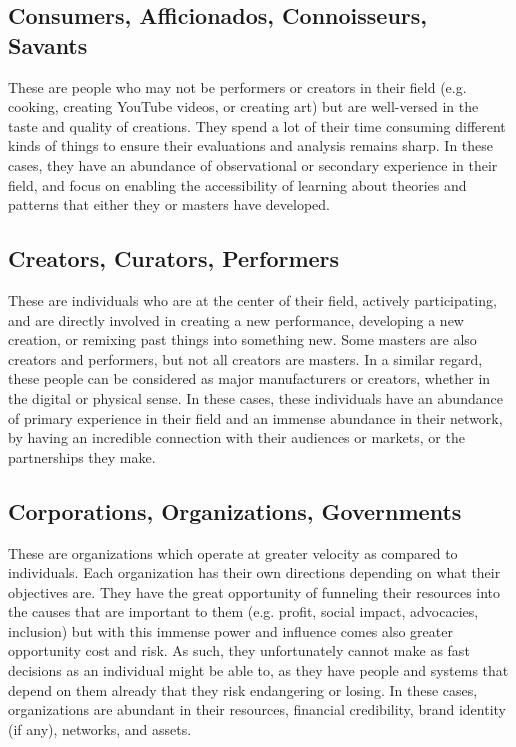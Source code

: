 \documentclass[conference]{IEEEtran}
\begin{document}
\subsection{Consumers, Afficionados, Connoisseurs, Savants}

These are people who may not be performers or creators in their field (e.g. cooking,
creating YouTube videos, or creating art) but are well-versed in the taste and 
quality of creations. They spend a lot of their time consuming different kinds of
things to ensure their evaluations and analysis remains sharp. In these cases, 
they have an abundance of observational or secondary experience in their field,
and focus on enabling the accessibility of learning about theories and patterns 
that either they or masters have developed.

\subsection{Creators, Curators, Performers}

These are individuals who are at the center of their field, actively participating,
and are directly involved in creating a new performance, developing a new creation, 
or remixing past things into something new. Some masters are also creators and 
performers, but not all creators are masters. In a similar regard, these people can
be considered as major manufacturers or creators, whether in the digital or physical 
sense. In these cases, these individuals have an abundance of primary experience in
their field and an immense abundance in their network, by having an incredible
connection with their audiences or markets, or the partnerships they make.

\subsection{Corporations, Organizations, Governments}

These are organizations which operate at greater velocity as compared to individuals.
Each organization has their own directions depending on what their objectives are.
They have the great opportunity of funneling their resources into the causes that
are important to them (e.g. profit, social impact, advocacies, inclusion) but with
this immense power and influence comes also greater opportunity cost and risk. As
such, they unfortunately cannot make as fast decisions as an individual might be 
able to, as they have people and systems that depend on them already that they risk
endangering or losing. In these cases, organizations are abundant in their resources,
financial credibility, brand identity (if any), networks, and assets.
\end{document}

